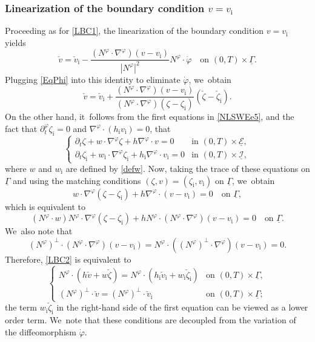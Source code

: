 \documentclass[10pt]{amsart}
\newcommand{\dt}{\partial_t}
\newcommand{\cI}{{\mathcal I}}
\newcommand{\cE}{{\mathcal E}}
\newcommand{\ul}[1]{\underline{#1}}
\newcommand{\itGamma}{\mathit{\Gamma}}
\theoremstyle{definition}
\begin{document}
\subsubsection{Linearization of the boundary condition $v=v_\mathrm{i}$}
Proceeding as for \eqref{LBC1}, the linearization of the boundary condition $v=v_\mathrm{i}$ yields
\[
\check{v}=\check{v}_\mathrm{i}-\frac{(N^\varphi\cdot\nabla^\varphi)(v-v_\mathrm{i})}{|N^\varphi|^2} N^\varphi\cdot\dot{\varphi}
\quad\text{on } (0,T)\times\ul{\itGamma}.
\]
Plugging \eqref{EqPhi} into this identity to eliminate $\dot{\varphi}$, we~obtain
\begin{equation}\label{LBC2}
\check{v} = \check{v}_\mathrm{i}
+ \frac{(N^\varphi\cdot\nabla^\varphi)(v-v_\mathrm{i})}{(N^\varphi\cdot\nabla^\varphi)(\zeta-\zeta_\mathrm{i})} (\check{\zeta}-\check{\zeta}_\mathrm{i}).
\end{equation}
On the other hand, it~follows from the first equations in \eqref{NLSWEe5},
and the fact that $\dt^\varphi\zeta_\mathrm{i}=0$ and $\nabla^\varphi\cdot(h_\mathrm{i}v_\mathrm{i})=0$, that
\[
\begin{cases}
\dt\zeta+w\cdot\nabla^\varphi\zeta+h\nabla^\varphi\cdot v=0 &\text{in } (0,T)\times\ul{\cE}, \\
\dt\zeta_\mathrm{i}+w_\mathrm{i}\cdot\nabla^\varphi\zeta_\mathrm{i}+h_\mathrm{i}\nabla^\varphi\cdot v_\mathrm{i}=0 &\text{in } (0,T)\times\ul{\cI},
\end{cases}
\]
where $w$ and $w_\mathrm{i}$ are defined by \eqref{defw}.
Now, taking the trace of these equations on $\ul{\itGamma}$ and using the matching conditions $(\zeta,v)=(\zeta_\mathrm{i},v_\mathrm{i})$ on $\ul{\itGamma}$, we~obtain
\[
w\cdot\nabla^\varphi(\zeta-\zeta_\mathrm{i})+h\nabla^\varphi\cdot(v-v_\mathrm{i})=0\quad \text{on }\ul{\itGamma},
\]
which is equivalent to
\[
(N^\varphi\cdot w)N^\varphi\cdot\nabla^\varphi(\zeta-\zeta_\mathrm{i})+hN^\varphi\cdot(N^\varphi\cdot\nabla^\varphi)(v-v_\mathrm{i})=0\quad \text{on }\ul{\itGamma}.
\]
We~also note that
\[
(N^\varphi)^\perp\cdot(N^\varphi\cdot\nabla^\varphi)(v-v_\mathrm{i})=N^\varphi\cdot((N^\varphi)^\perp\cdot\nabla^\varphi)(v-v_\mathrm{i})=0.
\]
Therefore, \eqref{LBC2} is equivalent to
\begin{equation}\label{LBC3}
\begin{cases}
N^\varphi\cdot(h\check{v}+w\check{\zeta})=N^\varphi\cdot(h_\mathrm{i}\check{v}_\mathrm{i}+w_\mathrm{i}\check{\zeta}_\mathrm{i}) &\text{on } (0,T)\times\ul{\itGamma}, \\
(N^\varphi)^\perp\cdot\check{v}=(N^\varphi)^\perp\cdot\check{v}_\mathrm{i} &\text{on } (0,T)\times\ul{\itGamma};
\end{cases}
\end{equation}
the term $w_\mathrm{i}\check{\zeta}_\mathrm{i}$ in the right-hand side of the first equation can be viewed as a lower order term. We~note that these conditions are decoupled from the variation of the diffeomorphism $\dot{\varphi}$.
\end{document}
